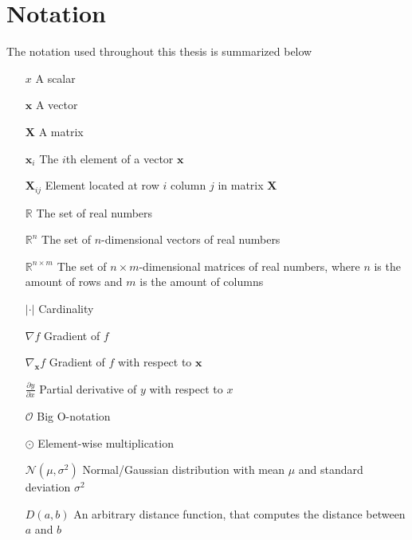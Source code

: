 \documentclass[./main.tex]{subfiles}
\begin{document}
\section{Notation}
The notation used throughout this thesis is summarized below

\begin{itemize}[leftmargin=2.0cm,labelsep=0.5cm]
    \item[$x$] A scalar
    \item[$\bm{x}$] A vector
    \item[$\bm{X}$] A matrix
    \item[$\bm{x}_i$] The $i$th element of a vector $\bm{x}$ 
    \item[$\bm{X}_{ij}$] Element located at row $i$ column $j$ in matrix $\bm{X}$
    \item[$\mathbb{R}$] The set of real numbers
    \item[$\mathbb{R}^n$] The set of $n$-dimensional vectors of real numbers
    \item[$\mathbb{R}^{n \times m}$] The set of $n \times m$-dimensional matrices of real numbers, where $n$ is the amount of rows and $m$ is the amount of columns
    \item[$|\cdot|$] Cardinality
    \item[$\nabla f$] Gradient of $f$
    \item[$\nabla_{\bm{x}} f$] Gradient of $f$ with respect to $\bm{x}$ 
    \item[$\frac{\partial y}{\partial x}$] Partial derivative of $y$ with respect to $x$
    \item[$\mathcal{O}$] Big O-notation
    \item[$\odot$] Element-wise multiplication
    \item[$\mathcal{N} \left(\mu, \sigma^2 \right)$] Normal/Gaussian distribution with mean $\mu$ and standard deviation $\sigma^2$
    \item[$D(a, b)$] An arbitrary distance function, that computes the distance between $a$ and $b$
\end{itemize}
\end{document}
